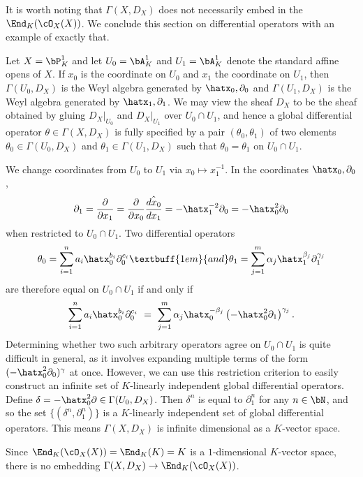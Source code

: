 It is worth noting that $\Gamma(X,D_X)$ does not necessarily embed in the $\End_K(\cO_X(X))$. We conclude this section on differential operators with an example of exactly that.
\begin{example}\label{example:diff-op-on-proj}
	Let $X = \bP^1_K$ and let $U_0 = \bA^1_K$ and $U_1 = \bA^1_K$ denote the standard affine opens of $X$. If $x_0$ is the coordinate on $U_0$ and $x_1$ the coordinate on $U_1$, then $\Gamma(U_0,D_X)$ is the Weyl algebra generated by $\hatx_0,\partial_0$ and $\Gamma(U_1,D_X)$ is the Weyl algebra generated by $\hatx_1,\partial_1$. We may view the sheaf $D_X$ to be the sheaf obtained by gluing $D_X|_{U_0}$ and $D_X|_{U_1}$ over $U_0\cap U_1$, and hence a global differential operator $\theta \in \Gamma(X,D_X)$ is fully specified by a pair $(\theta_0,\theta_1)$ of two elements $\theta_0 \in \Gamma(U_0, D_X)$ and $\theta_1 \in \Gamma(U_1,D_X)$ such that $\theta_0 = \theta_1$ on $U_0\cap U_1$.

	We change coordinates from $U_0$ to $U_1$ via $x_0 \mapsto x_1^{-1}$. In the coordinates $\hatx_0,\partial_0$,
	\begin{align*}
		\partial_1 = \frac{\partial}{\partial x_1} = \frac{\partial}{\partial x_0}\hat{\frac{dx_0}{dx_1}} = -\hatx_1^{-2}\partial_0 = -\hatx_0^2\partial_0
	\end{align*}
	when restricted to $U_0\cap U_1$. Two differential operators
	\begin{align*}
		\theta_0 = \sum_{i=1}^n a_i\hatx_0^{b_i} \partial_0^{c_i} \textbuff{1em}{and} \theta_1 = \sum_{j=1}^m \alpha_j\hatx_1^{\beta_j} \partial_1^{\gamma_j}
	\end{align*}
	are therefore equal on $U_0\cap U_1$ if and only if
	\begin{align*}
		\sum_{i=1}^n a_i\hatx_0^{b_i} \partial_0^{c_i} ~=~ \sum_{j=1}^m \alpha_j\hatx_0^{-\beta_j} \left(-\hatx_0^2\partial_1\right)^{\gamma_j}.
	\end{align*}
	Determining whether two such arbitrary operators agree on $U_0\cap U_1$ is quite difficult in general, as it involves expanding multiple terms of the form $(-\hatx_0^2\partial_0)^{\gamma}$ at once. However, we can use this restriction criterion to easily construct an infinite set of $K$-linearly independent global differential operators. Define $\delta = -\hatx_0^2\partial \in \Gamma(U_0,D_X)$. Then $\delta^n$ is equal to $\partial_1^n$ for any $n \in \bN$, and so the set $\{(\delta^n,\partial_1^n)\}$ is a $K$-linearly independent set of global differential operators. This means $\Gamma(X,D_X)$ is infinite dimensional as a $K$-vector space.

	Since $\End_K(\cO_X(X)) = \End_K(K) = K$ is a $1$-dimensional $K$-vector space, there is no embedding $\Gamma(X,D_X) \to \End_K(\cO_X(X))$.
\end{example}

